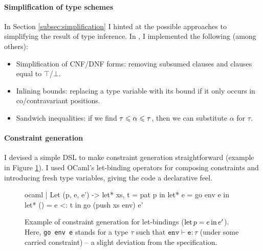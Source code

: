 
\paragraph{Simplification of type schemes} In Section \ref{subsec:simplification} I hinted at the possible approaches to simplifying the result of type inference. In \compiler{}, I implemented the following (among others): \begin{itemize}
    \item Simplification of CNF/DNF forms: removing subsumed clauses and clauses equal to $\top$/$\bot$.
    \item Inlining bounds: replacing a type variable with its bound if it only occurs in co/contravariant positions.
    \item Sandwich inequalities: if we find $\tau \leqslant \alpha \leqslant \tau$, then we can substitute $\alpha$ for $\tau$.
\end{itemize}

\paragraph{Constraint generation} I devised a simple DSL to make constraint generation straightforward (example in Figure \ref{fig:cstr-gen}). I used OCaml's let-binding operators for composing constraints and introducing fresh type variables, giving the code a declarative feel. 

\begin{figure}
    \centering
\begin{cminted}{ocaml}
| Let (p, e, e') ->
    let* xs, t = pat p in
    let* e = go env e in
    let* () = e <: t in
    go (push xs env) e'
\end{cminted}
    \caption{Example of constraint generation for \fabric{} let-bindings ($\mathrm{let}\,{p}={e}\,\mathrm{in}\, e'$). Here, \texttt{go env e} stands for a type $\tau$ such that $\texttt{env} \vdash \texttt{e} : \tau$ (under some carried constraint) -- a slight deviation from the specification.}
    \label{fig:cstr-gen}
\end{figure}

